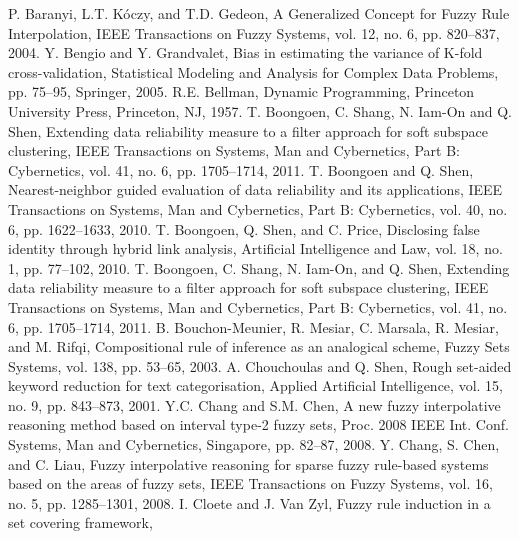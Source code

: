P. Baranyi, L.T. K\'{o}czy, and T.D. Gedeon,
A Generalized Concept for Fuzzy Rule Interpolation, IEEE Transactions on Fuzzy Systems,
vol. 12, no. 6, pp. 820--837,
2004.
Y. Bengio and Y. Grandvalet,
Bias in estimating the variance of K-fold cross-validation,
Statistical Modeling and Analysis for Complex Data Problems,
pp. 75--95, Springer,
2005.
R.E. Bellman,
Dynamic Programming,
Princeton University Press, Princeton,
NJ,
1957.
T. Boongoen, C. Shang, N. Iam-On and Q. Shen,
Extending data reliability measure to a filter approach for soft subspace clustering,
IEEE Transactions on Systems, Man and Cybernetics, Part B: Cybernetics,
vol. 41, no. 6, pp. 1705--1714,
2011.
T. Boongoen and Q. Shen,
Nearest-neighbor guided evaluation of data reliability and its applications,
IEEE Transactions on Systems, Man and Cybernetics, Part B: Cybernetics,
vol. 40, no. 6, pp. 1622--1633,
2010.
T. Boongoen, Q. Shen, and C. Price,
Disclosing false identity through hybrid link analysis,
Artificial Intelligence and Law,
vol. 18, no. 1, pp. 77--102,
2010.
T. Boongoen, C. Shang, N. Iam-On, and Q. Shen,
Extending data reliability measure to a filter approach for soft subspace clustering,
IEEE Transactions on Systems, Man and Cybernetics, Part B: Cybernetics,
vol. 41, no. 6, pp. 1705--1714,
2011.
B. Bouchon-Meunier, R. Mesiar, C. Marsala, R. Mesiar, and M. Rifqi,
Compositional rule of inference as an analogical scheme,
Fuzzy Sets Systems,
vol. 138, pp. 53--65,
2003.
A. Chouchoulas and Q. Shen,
Rough set-aided keyword reduction for text categorisation,
Applied Artificial Intelligence,
vol. 15, no. 9, pp. 843--873,
2001.
Y.C. Chang and S.M. Chen,
A new fuzzy interpolative reasoning method based on interval type-2 fuzzy sets,
Proc. 2008 IEEE Int. Conf. Systems, Man and Cybernetics, Singapore,
pp. 82--87, 2008.
Y. Chang, S. Chen, and C. Liau,
Fuzzy interpolative reasoning for sparse fuzzy rule-based systems based on the areas of fuzzy sets,
IEEE Transactions on Fuzzy Systems,
vol. 16, no. 5, pp. 1285--1301,
2008.
I. Cloete and J. Van Zyl,
Fuzzy rule induction in a set covering framework,
